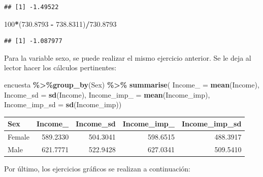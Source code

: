 \documentclass[
  spanish,
  12pt,
]{book}
\newenvironment{Shaded}{\begin{snugshade}}{\end{snugshade}}
\newcommand{\AttributeTok}[1]{\textcolor[rgb]{0.13,0.29,0.53}{#1}}
\newcommand{\DecValTok}[1]{\textcolor[rgb]{0.00,0.00,0.81}{#1}}
\newcommand{\FloatTok}[1]{\textcolor[rgb]{0.00,0.00,0.81}{#1}}
\newcommand{\FunctionTok}[1]{\textcolor[rgb]{0.13,0.29,0.53}{\textbf{#1}}}
\newcommand{\NormalTok}[1]{#1}
\newcommand{\SpecialCharTok}[1]{\textcolor[rgb]{0.81,0.36,0.00}{\textbf{#1}}}
\begin{document}
\begin{verbatim}
## [1] -1.49522
\end{verbatim}

\begin{Shaded}
\begin{Highlighting}[]
\DecValTok{100}\SpecialCharTok{*}\NormalTok{(}\FloatTok{730.8793} \SpecialCharTok{{-}} \FloatTok{738.8311}\NormalTok{)}\SpecialCharTok{/}\FloatTok{730.8793}
\end{Highlighting}
\end{Shaded}

\begin{verbatim}
## [1] -1.087977
\end{verbatim}

Para la variable sexo, se puede realizar el mismo ejercicio anterior. Se le deja al lector hacer los cálculos pertinentes:

\begin{Shaded}
\begin{Highlighting}[]
\NormalTok{encuesta }\SpecialCharTok{\%\textgreater{}\%}\FunctionTok{group\_by}\NormalTok{(Sex) }\SpecialCharTok{\%\textgreater{}\%}  \FunctionTok{summarise}\NormalTok{(}
  \AttributeTok{Income\_ =} \FunctionTok{mean}\NormalTok{(Income),}
  \AttributeTok{Income\_sd =} \FunctionTok{sd}\NormalTok{(Income),}
  \AttributeTok{Income\_imp\_ =} \FunctionTok{mean}\NormalTok{(Income\_imp),}
  \AttributeTok{Income\_imp\_sd =} \FunctionTok{sd}\NormalTok{(Income\_imp))}
\end{Highlighting}
\end{Shaded}

\begin{tabular}{l|r|r|r|r}
\hline
Sex & Income\_ & Income\_sd & Income\_imp\_ & Income\_imp\_sd\\
\hline
Female & 589.2330 & 504.3041 & 598.6515 & 488.3917\\
\hline
Male & 621.7771 & 522.9428 & 627.0341 & 509.5410\\
\hline
\end{tabular}

Por último, los ejercicios gráficos se realizan a continuación:
\end{document}
